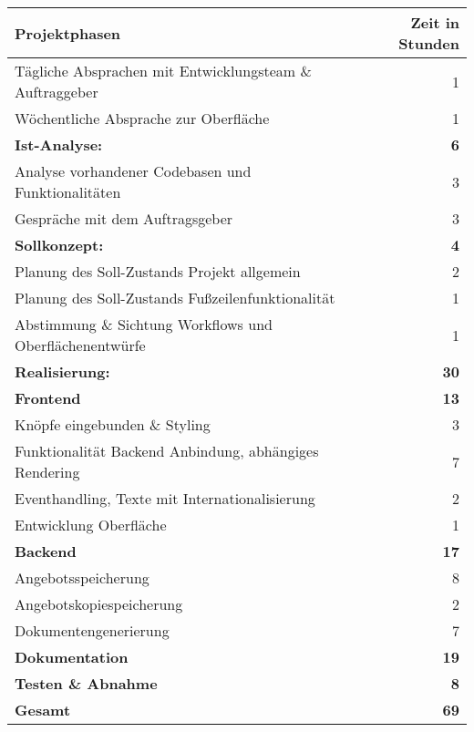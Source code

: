 {
\begin{tabular}{|l|r|}
	\hline
	\textbf{Projektphasen }                                   & \textbf{Zeit in Stunden} \\ \hline
	Tägliche Absprachen mit Entwicklungsteam \& Auftraggeber &                        1 \\
	Wöchentliche Absprache zur Oberfläche                     &                        1 \\
	\textbf{Ist-Analyse: }                                    &               \textbf{6} \\
	Analyse vorhandener Codebasen und Funktionalitäten        &                        3 \\
	Gespräche mit dem Auftragsgeber                           &                        3 \\
	\textbf{Sollkonzept:  }                                   &               \textbf{4} \\
	Planung des Soll-Zustands Projekt allgemein               &                        2 \\
	Planung des Soll-Zustands Fußzeilenfunktionalität         &                        1 \\
	Abstimmung \& Sichtung Workflows und Oberflächenentwürfe  &                        1 \\
	\textbf{Realisierung: }                                   &              \textbf{30} \\
	\textbf{Frontend  }                                       &              \textbf{13} \\
	Knöpfe eingebunden \& Styling                             &                        3 \\
	Funktionalität Backend Anbindung, abhängiges Rendering    &                        7 \\
	Eventhandling, Texte mit Internationalisierung            &                        2 \\
		Entwicklung Oberfläche                                    &                        1 \\
	\textbf{Backend  }                                        &             \textbf{ 17} \\
	Angebotsspeicherung                                       &                        8 \\
	Angebotskopiespeicherung                                  &                        2 \\
	Dokumentengenerierung                                     &                        7 \\
	\textbf{Dokumentation }                                   &             \textbf{ 19} \\
	\textbf{Testen \& Abnahme }                               &              \textbf{ 8} \\ \hline
	\textbf{Gesamt}                                      &             \textbf{ 69} \\ \hline
\end{tabular}


}
